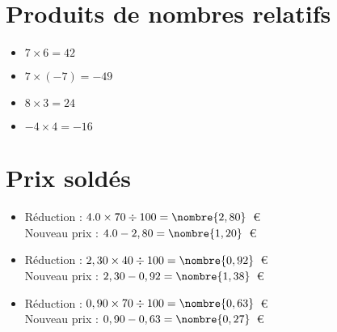 \documentclass[a4paper,11pt,fleqn]{article}
\begin{document}
\section{Produits de nombres relatifs}
\begin{itemize}

  \item $7\times6=42$
  \item $7\times(-7)=-49$
  \item $8\times3=24$
  \item $-4\times4=-16$
\end{itemize}

\section{Prix soldés}
\begin{itemize}

  \item Réduction : $4.0\times70\div100=\nombre{2,80}$~€\\
  Nouveau prix : $4.0-2,80=\nombre{1,20}$~€
  \item Réduction : $2,30\times40\div100=\nombre{0,92}$~€\\
  Nouveau prix : $2,30-0,92=\nombre{1,38}$~€
  \item Réduction : $0,90\times70\div100=\nombre{0,63}$~€\\
  Nouveau prix : $0,90-0,63=\nombre{0,27}$~€
\end{itemize}
\end{document}

